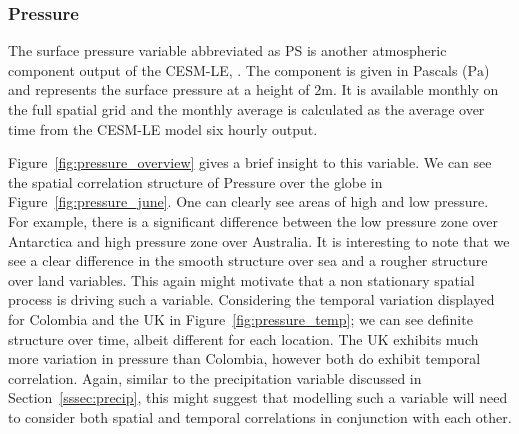 \subsubsection{Pressure \label{sssec:pressure}}
The surface pressure variable abbreviated as PS is another atmospheric component output of the CESM-LE, \citep{kay_community_2015}.
The component is given in Pascals ($\si{\pascal}$) and represents the surface pressure at a height of $2\si{\meter}$. It is available monthly on the full spatial grid and the monthly average is calculated as the average over time from the CESM-LE model six hourly output.

Figure~\ref{fig:pressure_overview} gives a brief insight to this variable. 
We can see the spatial correlation structure of Pressure over the globe in Figure~\ref{fig:pressure_june}.
One can clearly see areas of high and low pressure.
For example, there is a significant difference between the low pressure zone over Antarctica and high pressure zone over Australia. 
It is interesting to note that we see a clear difference in the smooth structure over sea and a rougher structure over land variables. 
This again might motivate that a non stationary spatial process is driving such a variable.
Considering the temporal variation displayed for Colombia and the UK in Figure~\ref{fig:pressure_temp}; we can see definite structure over time, albeit different for each location.
The UK exhibits much more variation in pressure than Colombia, however both do exhibit temporal correlation. 
Again, similar to the precipitation variable discussed in Section~\ref{sssec:precip}, this might suggest that modelling such a variable will need to consider both spatial and temporal correlations in conjunction with each other.

